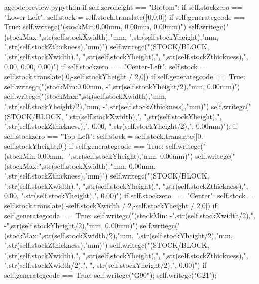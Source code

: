 \documentclass{ltxdoc}
\begin{document}
\begin{writecode}{a}{gcodepreview.py}{python}
        if self.zeroheight == "Bottom":
            if self.stockzero == "Lower-Left":
                 self.stock = self.stock.translate([0,0,0])
                 if self.generategcode == True:
                     self.writegc("(stockMin:0.00mm, 0.00mm, 0.00mm)")
                     self.writegc("(stockMax:",str(self.stockXwidth),"mm, ",str(self.stockYheight),"mm,  ",str(self.stockZthickness),"mm)")
                     self.writegc("(STOCK/BLOCK, ",str(self.stockXwidth),", ",str(self.stockYheight),", ",str(self.stockZthickness),", 0.00, 0.00, 0.00)")
            if self.stockzero == "Center-Left":
                self.stock = self.stock.translate([0,-self.stockYheight / 2,0])
                if self.generategcode == True:
                    self.writegc("(stockMin:0.00mm, -",str(self.stockYheight/2),"mm, 0.00mm)")
                    self.writegc("(stockMax:",str(self.stockXwidth),"mm, ",str(self.stockYheight/2),"mm, -",str(self.stockZthickness),"mm)")
                    self.writegc("(STOCK/BLOCK, ",str(self.stockXwidth),", ",str(self.stockYheight),", ",str(self.stockZthickness),", 0.00, ",str(self.stockYheight/2),", 0.00mm)");
            if self.stockzero == "Top-Left":
                self.stock = self.stock.translate([0,-self.stockYheight,0])
                if self.generategcode == True:
                    self.writegc("(stockMin:0.00mm, -",str(self.stockYheight),"mm, 0.00mm)")
                    self.writegc("(stockMax:",str(self.stockXwidth),"mm, 0.00mm, ",str(self.stockZthickness),"mm)")
                    self.writegc("(STOCK/BLOCK, ",str(self.stockXwidth),", ",str(self.stockYheight),", ",str(self.stockZthickness),", 0.00, ",str(self.stockYheight),", 0.00)")
            if self.stockzero == "Center":
                self.stock = self.stock.translate([-self.stockXwidth / 2,-self.stockYheight / 2,0])
                if self.generategcode == True:
                    self.writegc("(stockMin: -",str(self.stockXwidth/2),", -",str(self.stockYheight/2),"mm, 0.00mm)")
                    self.writegc("(stockMax:",str(self.stockXwidth/2),"mm, ",str(self.stockYheight/2),"mm, ",str(self.stockZthickness),"mm)")
                    self.writegc("(STOCK/BLOCK, ",str(self.stockXwidth),", ",str(self.stockYheight),", ",str(self.stockZthickness),", ",str(self.stockXwidth/2),", ", str(self.stockYheight/2),", 0.00)")
        if self.generategcode == True:
            self.writegc("G90");
            self.writegc("G21");

\end{writecode}
\addtocounter{gcpy}{54}
\end{document}
